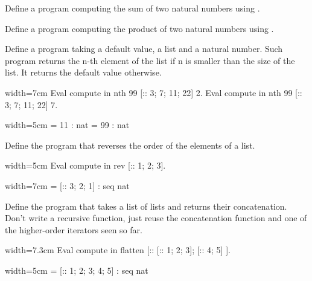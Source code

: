 \begin{Exercise}[label=ex:iteradd,difficulty=0,title={Addition with iteration}]
Define a program computing the sum of two natural numbers
using .
\end{Exercise}

\begin{Exercise}[label=ex:itermul,difficulty=0,title={Multiplication with iteration}]
Define a program computing the product of two natural numbers
using .
\end{Exercise}

\begin{Exercise}[label=ex:nth,difficulty=0,title={Find the n-th element}]
Define a program taking a default value, a list and  a natural number.  Such
program returns the n-th element of the list if n is smaller than the size of
the list.  It returns the default value otherwise.

\begin{coq}{}{width=7cm}
Eval compute in
  nth 99 [:: 3; 7; 11; 22] 2.
Eval compute in
  nth 99 [:: 3; 7; 11; 22] 7.
\end{coq}
\begin{coqout}{}{width=5cm}
     = 11
     : nat
     = 99
     : nat
\end{coqout}
\end{Exercise}

\begin{Exercise}[label=ex:rev,difficulty=0,title={List reversal}]
Define the program  that reverses the order of the elements
of a list. 

\begin{coq}{}{width=5cm}
Eval compute in
  rev [:: 1; 2; 3].
\end{coq}
\begin{coqout}{}{width=7cm}
 = [:: 3; 2; 1]
 : seq nat
\end{coqout}
\end{Exercise}

\begin{Exercise}[label=ex:flatten,difficulty=1,title={List flattening}]
Define the program  that takes a list of lists and returns
their concatenation.  Don't write a recursive function, just reuse
the concatenation function and one of the higher-order iterators
seen so far.

\begin{coq}{}{width=7.3cm}
Eval compute in
  flatten [:: [:: 1; 2; 3]; [:: 4; 5] ].
\end{coq}
\begin{coqout}{}{width=5cm}
 = [:: 1; 2; 3; 4; 5]
 : seq nat
\end{coqout}
\end{Exercise}


